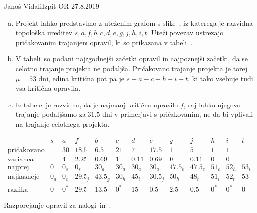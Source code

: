 \begin{naloga}{Janoš Vidali}{Izpit OR 27.8.2019}
\begin{odgovor}
\begin{enumerate}[(a)]
\item Projekt lahko predstavimo z uteženim grafom s slike~\fig,
iz katerega je razvidna topološka ureditev
$s, a, f, b, c, d, e, g, j, h, i, t$.
Uteži povezav ustrezajo pričakovanim trajanjem opravil,
ki so prikazana v tabeli~.

\item V tabeli~
so podani najzgodnejši začetki opravil in najpoznejši začetki,
da se celotno trajanje projekta ne podaljša.
Pričakovano trajanje projekta je torej $\mu = 53$ dni,
edina kritična pot pa je $s - a - c - h - i - t$,
ki tako vsebuje tudi vsa kritična opravila.

\item Iz tabele~ je razvidno,
da je najmanj kritično opravilo $f$,
saj lahko njegovo trajanje
podaljšamo za $31.5$ dni v primerjavi s pričakovanim,
ne da bi vplivali na trajanje celotnega projekta.
\end{enumerate}
%
\begin{slika}
\makebox[\textwidth][c]{
\pgfslika
}
\end{slika}
%
\begin{tabela}
$$
\begin{array}{c|cccccccccccc}
& s & a & f & b & c & d & e & g & j & h & i & t \\ \hline
\text{pričakovano} && 30 & 18.5 & 6.5 & 21 & 7 & 17.5 & 1 & 5 & 1 & 1 \\
\text{varianca} && 4 & 2.25 & 0.69 & 1 & 0.11 & 0.69 & 0 & 0.11 & 0 & 0 \\
\hline
\text{najprej} & 0 & 0_s & 0_s & 30_a & 30_a & 30_a & 30_a & 47.5_e & 47.5_e & 51_c & 52_h & 53_i \\
\text{najkasneje} & 0_a & 0_c & 29.5_j & 43.5_g & 30_h & 45_i & 30.5_j & 50_h & 48_t & 51_i & 52_t & 53 \\
\text{razlika} & 0 & 0^* & 29.5 & 13.5 & 0^* & 15 & 0.5 & 2.5 & 0.5 & 0^* & 0^* & 0
\end{array}
$$
\caption{Razporejanje opravil za nalogi~\nal in~\nal[dirka2].}
\end{tabela}
\end{odgovor}
\end{naloga}
